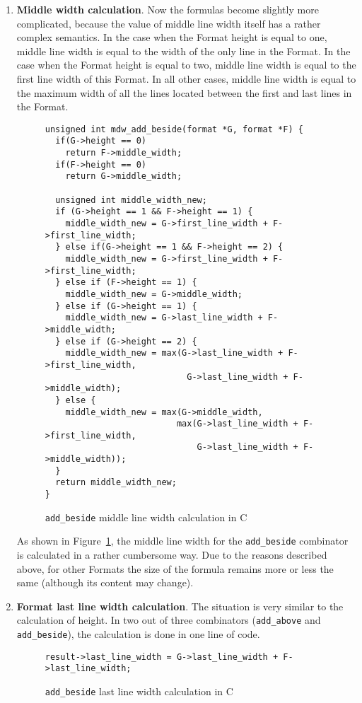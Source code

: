 \documentclass[14pt]{constructor-diploma}
\begin{document}
\begin{enumerate}
  \item \textbf{Middle width calculation}.
  Now the formulas become slightly more complicated, because the value of middle line width itself has a rather complex semantics. 
  In the case when the Format height is equal to one, middle line width is equal to the width of the only line in the Format. 
  In the case when the Format height is equal to two, middle line width is equal to the first line width of this Format. 
  In all other cases, middle line width is equal to the maximum width of all the lines located between the first and last lines in the Format.
\begin{figure}[H]
\begin{mdframed}[backgroundcolor=bg]
\begin{verbatim}
unsigned int mdw_add_beside(format *G, format *F) {
  if(G->height == 0)
    return F->middle_width;
  if(F->height == 0)
    return G->middle_width;

  unsigned int middle_width_new;
  if (G->height == 1 && F->height == 1) {
    middle_width_new = G->first_line_width + F->first_line_width;
  } else if(G->height == 1 && F->height == 2) {
    middle_width_new = G->first_line_width + F->first_line_width;
  } else if (F->height == 1) {
    middle_width_new = G->middle_width;
  } else if (G->height == 1) {
    middle_width_new = G->last_line_width + F->middle_width;
  } else if (G->height == 2) {
    middle_width_new = max(G->last_line_width + F->first_line_width, 
                            G->last_line_width + F->middle_width);
  } else {
    middle_width_new = max(G->middle_width,
                          max(G->last_line_width + F->first_line_width, 
                              G->last_line_width + F->middle_width));
  }
  return middle_width_new;
}
\end{verbatim}
\end{mdframed}
\caption{\texttt{add\_beside} middle line width calculation in C}
\label{fig:mlw_calculation}
\end{figure}
As shown in Figure~\ref{fig:mlw_calculation}, the middle line width for the \texttt{add\_beside} combinator is calculated in a rather cumbersome way. 
Due to the reasons described above, for other Formats the size of the formula remains more or less the same (although its content may change).

  \item \textbf{Format last line width calculation}. The situation is very similar to the calculation of height.
  In two out of three combinators (\texttt{add\_above} and \texttt{add\_beside}), the calculation is done in one line of code.
\begin{figure}[H]
\begin{mdframed}[backgroundcolor=bg]
\begin{verbatim}
result->last_line_width = G->last_line_width + F->last_line_width;
\end{verbatim}
\end{mdframed}
\caption{\texttt{add\_beside} last line width calculation in C}
\label{fig:llw_calculation}
\end{figure}


\end{enumerate}
\end{document}

